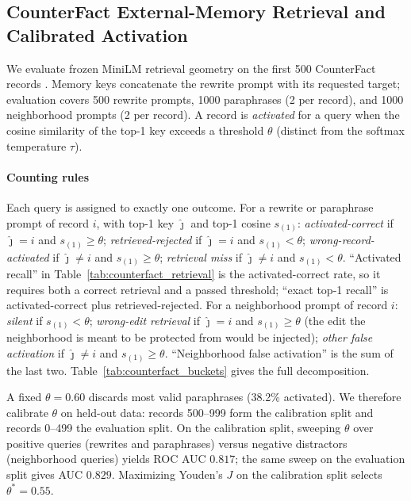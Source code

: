 \documentclass[preprint,12pt]{elsarticle}
\newcommand{\rev}[1]{#1}
\begin{document}
\subsection{CounterFact External-Memory Retrieval and Calibrated Activation}
\label{sec:counterfact}

We evaluate frozen MiniLM retrieval geometry on the first 500 CounterFact records \cite{meng2022locating}. Memory keys concatenate the rewrite prompt with its requested target; evaluation covers 500 rewrite prompts, 1000 paraphrases (2 per record), and 1000 neighborhood prompts (2 per record). A record is \emph{activated} for a query when the cosine similarity of the top-1 key exceeds a threshold $\theta$ (distinct from the softmax temperature $\tau$).

\paragraph{Counting rules}
\rev{Each query is assigned to exactly one outcome. For a rewrite or paraphrase prompt of record $i$, with top-1 key $\hat\jmath$ and top-1 cosine $s_{(1)}$: \emph{activated-correct} if $\hat\jmath=i$ and $s_{(1)}\ge\theta$; \emph{retrieved-rejected} if $\hat\jmath=i$ and $s_{(1)}<\theta$; \emph{wrong-record-activated} if $\hat\jmath\ne i$ and $s_{(1)}\ge\theta$; \emph{retrieval miss} if $\hat\jmath\ne i$ and $s_{(1)}<\theta$. ``Activated recall'' in Table~\ref{tab:counterfact_retrieval} is the activated-correct rate, so it requires both a correct retrieval and a passed threshold; ``exact top-1 recall'' is activated-correct plus retrieved-rejected. For a neighborhood prompt of record $i$: \emph{silent} if $s_{(1)}<\theta$; \emph{wrong-edit retrieval} if $\hat\jmath=i$ and $s_{(1)}\ge\theta$ (the edit the neighborhood is meant to be protected from would be injected); \emph{other false activation} if $\hat\jmath\ne i$ and $s_{(1)}\ge\theta$. ``Neighborhood false activation'' is the sum of the last two. Table~\ref{tab:counterfact_buckets} gives the full decomposition.}

A fixed $\theta=0.60$ discards most valid paraphrases (38.2\% activated). We therefore calibrate $\theta$ on held-out data: records 500--999 form the calibration split and records 0--499 the evaluation split. On the calibration split, sweeping $\theta$ over positive queries (rewrites and paraphrases) versus negative distractors (neighborhood queries) yields ROC AUC $0.817$; the same sweep on the evaluation split gives AUC $0.829$. Maximizing Youden's $J$ on the calibration split selects $\theta^* = 0.55$.
\end{document}
